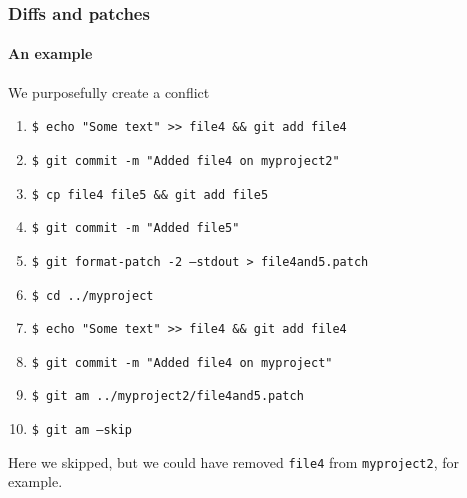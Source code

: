\begin{frame}
\frametitle{Diffs and patches}
\framesubtitle{An example}

\begin{block}{We purposefully create a conflict}
\begin{enumerate}
\item \texttt{\$ echo "Some text"  >\;\!\!> file4 \&\& git add file4} \\
\item \texttt{\$ git commit -m "Added file4 on myproject2"} \\
\item \texttt{\$ cp file4 file5 \&\& git add file5} \\
\item \texttt{\$ git commit -m "Added file5"} \\
\item \texttt{\$ git format-patch -2 ---stdout > file4and5.patch} \\
\item \texttt{\$ cd ../myproject} \\
\item \texttt{\$ echo "Some text"  >\;\!\!> file4 \&\& git add file4} \\
\item \texttt{\$ git commit -m "Added file4 on myproject"} \\
\item \texttt{\$ git am ../myproject2/file4and5.patch} \\
\item \texttt{\$ git am ---skip}
\end{enumerate}
\medskip
\pause
Here we skipped, but we could have removed \texttt{file4} from \texttt{myproject2}, for example.
\end{block}
\end{frame}
